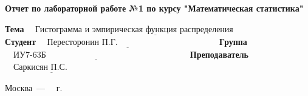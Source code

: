 \begin{titlepage}
    \begin{center}
        \Large\textbf{Отчет по лабораторной работе №1 по курсу "Математическая статистика"}
    \end{center}

    \noindent\textbf{Тема} $\underline{\text{~~~Гистограмма и эмпирическая функция распределения~~~~~~~~~~~~~~~~~~}}$\newline\newline\newline
    \noindent\textbf{Студент} $\underline{\text{~~~Пересторонин П.Г.~~~~~~~~~~~~~~~~~~~~~~~~~~~~~~~~~~~}}$\newline\newline
    \noindent\textbf{Группа} $\underline{\text{~~~ИУ7-63Б~~~~~~~~~~~~~~~~~~~~~~~~~~~~~~~~~~~~~~~~~~~~~~~~~~}}$\newline\newline
    \noindent\textbf{Преподаватель} $\underline{\text{~~~Саркисян П.С.~~~~~~~~~~~}}$\newline

    \begin{center}
        \vfill
        Москва~---~\the\year
        ~г.
    \end{center}
    \restoregeometry
\end{titlepage}
